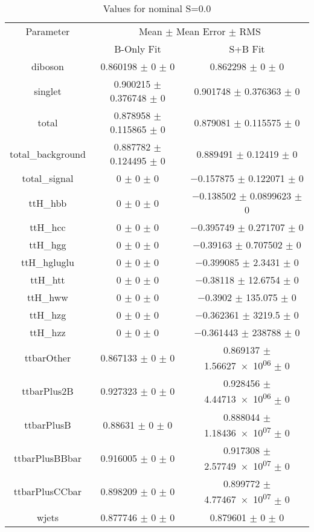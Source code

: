 \begin{table}
\centering
\caption{Values for nominal S=0.0}
\begin{tabular}{ccc}
\toprule
Parameter & \multicolumn{2}{c}{Mean $\pm$ Mean Error $\pm$ RMS}\\
 & B-Only Fit & S+B Fit\\
\midrule
diboson & \num{0.860198} $\pm$ \num{0} $\pm$ \num{0} & \num{0.862298} $\pm$ \num{0} $\pm$ \num{0}\\
singlet & \num{0.900215} $\pm$ \num{0.376748} $\pm$ \num{0} & \num{0.901748} $\pm$ \num{0.376363} $\pm$ \num{0}\\
total & \num{0.878958} $\pm$ \num{0.115865} $\pm$ \num{0} & \num{0.879081} $\pm$ \num{0.115575} $\pm$ \num{0}\\
total\_background & \num{0.887782} $\pm$ \num{0.124495} $\pm$ \num{0} & \num{0.889491} $\pm$ \num{0.12419} $\pm$ \num{0}\\
total\_signal & \num{0} $\pm$ \num{0} $\pm$ \num{0} & \num{-0.157875} $\pm$ \num{0.122071} $\pm$ \num{0}\\
ttH\_hbb & \num{0} $\pm$ \num{0} $\pm$ \num{0} & \num{-0.138502} $\pm$ \num{0.0899623} $\pm$ \num{0}\\
ttH\_hcc & \num{0} $\pm$ \num{0} $\pm$ \num{0} & \num{-0.395749} $\pm$ \num{0.271707} $\pm$ \num{0}\\
ttH\_hgg & \num{0} $\pm$ \num{0} $\pm$ \num{0} & \num{-0.39163} $\pm$ \num{0.707502} $\pm$ \num{0}\\
ttH\_hgluglu & \num{0} $\pm$ \num{0} $\pm$ \num{0} & \num{-0.399085} $\pm$ \num{2.3431} $\pm$ \num{0}\\
ttH\_htt & \num{0} $\pm$ \num{0} $\pm$ \num{0} & \num{-0.38118} $\pm$ \num{12.6754} $\pm$ \num{0}\\
ttH\_hww & \num{0} $\pm$ \num{0} $\pm$ \num{0} & \num{-0.3902} $\pm$ \num{135.075} $\pm$ \num{0}\\
ttH\_hzg & \num{0} $\pm$ \num{0} $\pm$ \num{0} & \num{-0.362361} $\pm$ \num{3219.5} $\pm$ \num{0}\\
ttH\_hzz & \num{0} $\pm$ \num{0} $\pm$ \num{0} & \num{-0.361443} $\pm$ \num{238788} $\pm$ \num{0}\\
ttbarOther & \num{0.867133} $\pm$ \num{0} $\pm$ \num{0} & \num{0.869137} $\pm$ \num{1.56627e+06} $\pm$ \num{0}\\
ttbarPlus2B & \num{0.927323} $\pm$ \num{0} $\pm$ \num{0} & \num{0.928456} $\pm$ \num{4.44713e+06} $\pm$ \num{0}\\
ttbarPlusB & \num{0.88631} $\pm$ \num{0} $\pm$ \num{0} & \num{0.888044} $\pm$ \num{1.18436e+07} $\pm$ \num{0}\\
ttbarPlusBBbar & \num{0.916005} $\pm$ \num{0} $\pm$ \num{0} & \num{0.917308} $\pm$ \num{2.57749e+07} $\pm$ \num{0}\\
ttbarPlusCCbar & \num{0.898209} $\pm$ \num{0} $\pm$ \num{0} & \num{0.899772} $\pm$ \num{4.77467e+07} $\pm$ \num{0}\\
wjets & \num{0.877746} $\pm$ \num{0} $\pm$ \num{0} & \num{0.879601} $\pm$ \num{0} $\pm$ \num{0}\\
\bottomrule
\end{tabular}
\end{table}